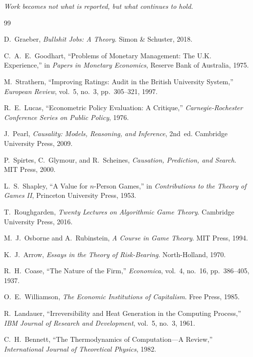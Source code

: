 \documentclass[12pt]{article}
\begin{document}
\medskip
\begin{center}
\textit{Work becomes not what is reported, but what continues to hold.}
\end{center}

\begin{thebibliography}{99}

D.~Graeber,
\textit{Bullshit Jobs: A Theory}.
Simon \& Schuster, 2018.

C.~A.~E.~Goodhart,
``Problems of Monetary Management: The U.K. Experience,''
in \textit{Papers in Monetary Economics}, Reserve Bank of Australia, 1975.

M.~Strathern,
``Improving Ratings: Audit in the British University System,''
\textit{European Review}, vol.~5, no.~3, pp.~305--321, 1997.

R.~E.~Lucas,
``Econometric Policy Evaluation: A Critique,''
\textit{Carnegie-Rochester Conference Series on Public Policy}, 1976.

J.~Pearl,
\textit{Causality: Models, Reasoning, and Inference}, 2nd~ed.
Cambridge University Press, 2009.

P.~Spirtes, C.~Glymour, and R.~Scheines,
\textit{Causation, Prediction, and Search}.
MIT Press, 2000.

L.~S.~Shapley,
``A Value for $n$-Person Games,''
in \textit{Contributions to the Theory of Games II},
Princeton University Press, 1953.

T.~Roughgarden,
\textit{Twenty Lectures on Algorithmic Game Theory}.
Cambridge University Press, 2016.

M.~J.~Osborne and A.~Rubinstein,
\textit{A Course in Game Theory}.
MIT Press, 1994.

K.~J.~Arrow,
\textit{Essays in the Theory of Risk-Bearing}.
North-Holland, 1970.

R.~H.~Coase,
``The Nature of the Firm,''
\textit{Economica}, vol.~4, no.~16, pp.~386--405, 1937.

O.~E.~Williamson,
\textit{The Economic Institutions of Capitalism}.
Free Press, 1985.

R.~Landauer,
``Irreversibility and Heat Generation in the Computing Process,''
\textit{IBM Journal of Research and Development}, vol.~5, no.~3, 1961.

C.~H.~Bennett,
``The Thermodynamics of Computation---A Review,''
\textit{International Journal of Theoretical Physics}, 1982.


\end{thebibliography}
\end{document}
